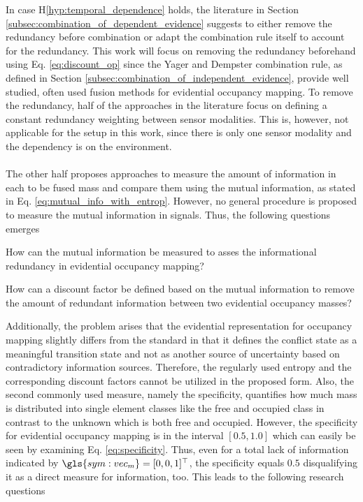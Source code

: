 In case H\ref{hyp:temporal_dependence} holds, the literature in Section \ref{subsec:combination_of_dependent_evidence} suggests to either remove the redundancy before combination or adapt the combination rule itself to account for the redundancy. This work will focus on removing the redundancy beforehand using Eq. \ref{eq:discount_op} since the Yager and Dempster combination rule, as defined in Section \ref{subsec:combination_of_independent_evidence}, provide well studied, often used fusion methods for evidential occupancy mapping. To remove the redundancy, half of the approaches in the literature focus on defining a constant redundancy weighting between sensor modalities. This is, however, not applicable for the setup in this work, since there is only one sensor modality and the dependency is on the environment.
\\\\
The other half proposes approaches to measure the amount of information in each to be fused mass and compare them using the mutual information, as stated in Eq. \ref{eq:mutual_info_with_entrop}. However, no general procedure is proposed to measure the mutual information in signals. Thus, the following questions emerges
\\
\begin{requ} \label{requ:how_to_meas_redund}
	How can the mutual information be measured to asses the informational redundancy in evidential occupancy mapping?
\end{requ}
\vspace{\baselineskip}
\begin{requ} \label{requ:how_to_define_discount_fact}
	How can a discount factor be defined based on the mutual information to remove the amount of redundant information between two evidential occupancy masses?
\end{requ}
Additionally, the problem arises that the evidential representation for occupancy mapping slightly differs from the standard in that it defines the conflict state as a meaningful transition state and not as another source of uncertainty based on contradictory information sources. Therefore, the regularly used entropy and the corresponding discount factors cannot be utilized in the proposed form. Also, the second commonly used measure, namely the specificity, quantifies how much mass is distributed into single element classes like the free and occupied class in contrast to the unknown which is both free and occupied. However, the specificity for evidential occupancy mapping is in the interval $[0.5,1.0]$ which can easily be seen by examining Eq. \ref{eq:specificity}. Thus, even for a total lack of information indicated by $\gls{sym:vec_m} = [0,0,1]^\top$, the specificity equals $0.5$ disqualifying it as a direct measure for information, too. This leads to the following research questions
